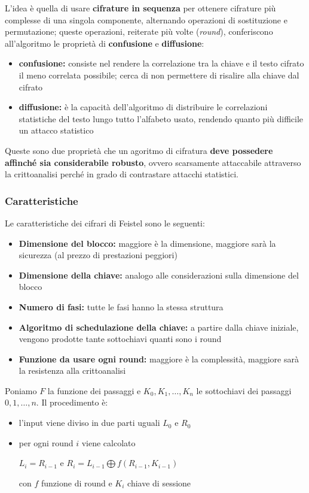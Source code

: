 \noindent L'idea è quella di usare \textbf{cifrature in sequenza} per ottenere cifrature più complesse di una singola componente, alternando 
operazioni di sostituzione e permutazione; queste operazioni, reiterate più volte (\textit{round}), conferiscono all'algoritmo le proprietà di \textbf{confusione}
e \textbf{diffusione}:
\begin{itemize}
    \item \textbf{confusione:} consiste nel rendere la correlazione tra la chiave e il testo cifrato il meno correlata possibile; cerca di non permettere 
    di risalire alla chiave dal cifrato 
    \item \textbf{diffusione:} è la capacità dell'algoritmo di distribuire le correlazioni statistiche del testo lungo tutto l'alfabeto 
    usato, rendendo quanto più difficile un attacco statistico
\end{itemize}

\noindent Queste sono due proprietà che un agoritmo di cifratura \textbf{deve possedere affinché sia considerabile robusto}, ovvero scarsamente 
attaccabile attraverso la crittoanalisi perché in grado di contrastare attacchi statistici.

\subsubsection{Caratteristiche}
Le caratteristiche dei cifrari di Feistel sono le seguenti:
\begin{itemize}
    \item \textbf{Dimensione del blocco:} maggiore è la dimensione, maggiore sarà la sicurezza (al prezzo di prestazioni peggiori)
    \item \textbf{Dimensione della chiave:} analogo alle considerazioni sulla dimensione del blocco 
    \item \textbf{Numero di fasi:} tutte le fasi hanno la stessa struttura 
    \item \textbf{Algoritmo di schedulazione della chiave:} a partire dalla chiave iniziale, vengono prodotte tante sottochiavi quanti sono i round
    \item \textbf{Funzione da usare ogni round:} maggiore è la complessità, maggiore sarà la resistenza alla crittoanalisi 
\end{itemize}

\noindent Poniamo $F$ la funzione dei passaggi e $K_0, K_1, \dots, K_n$ le sottochiavi dei passaggi $0, 1, \dots , n$. Il procedimento è:
\begin{itemize}
    \item l'input viene diviso in due parti uguali $L_0$ e $R_0$
    \item per ogni round $i$ viene calcolato 
    \begin{center}
        $L_i = R_{i-1}$ e $R_i = L_{i-1} \bigoplus f(R_{i-1}, K_{i-1})$
    \end{center}

    \noindent con $f$ funzione di round e $K_i$ chiave di sessione
\end{itemize}

